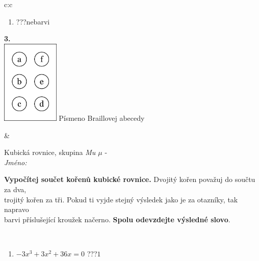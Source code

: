 \documentclass[10pt]{report}
\begin{document}
\begin{tabular}{c:c}
\begin{minipage}[c][104.5mm][t]{0.5\linewidth}
\begin{center}
\begin{minipage}{0.79\linewidth}
\begin{center}
\begin{varwidth}{\linewidth}
\begin{enumerate}
\item \quad \dotfill\; ???\;\dotfill \quad nebarvi
\end{enumerate}
\end{varwidth}
\end{center}
\end{minipage}
\begin{minipage}{0.20\linewidth}
\begin{center}
{\Huge\bfseries 3.} \\[2mm]
\includegraphics[height=40mm]{../images/braille.png}
{\small Písmeno Braillovej abecedy}
\end{center}
\end{minipage}
\end{center}
\end{minipage}
&
\begin{minipage}[c][104.5mm][t]{0.5\linewidth}
\begin{center}
\vspace{7mm}
{\huge Kubická rovnice, skupina \textit{Mu $\mu$} -}\\[5mm]
\textit{Jméno:}\phantom{xxxxxxxxxxxxxxxxxxxxxxxxxxxxxxxxxxxxxxxxxxxxxxxxxxxxxxxxxxxxxxxxx}\\[5mm]
\begin{minipage}{0.95\linewidth}
\begin{center}
\textbf{Vypočítej součet kořenů kubické rovnice.} Dvojitý kořen považuj do součtu za dva,\\trojitý kořen za tři. Pokud ti vyjde stejný výsledek jako je za otazníky, tak napravo\\barvi příslušející kroužek načerno. \textbf{Spolu odevzdejte výsledné slovo}.
\end{center}
\end{minipage}
\\[1mm]
\begin{minipage}{0.79\linewidth}
\begin{center}
\begin{varwidth}{\linewidth}
\begin{enumerate}
\Large
\item $-3x^3+3x^2+36x=0$\quad \dotfill\; ???\;\dotfill \quad $1$

\end{enumerate}
\end{varwidth}
\end{center}
\end{minipage}
\end{center}
\end{minipage}
\end{tabular}
\end{document}
